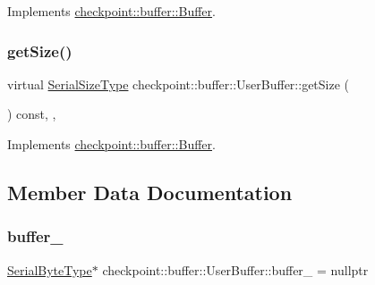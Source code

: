 Implements \hyperlink{structcheckpoint_1_1buffer_1_1_buffer_a11fcf5b280408aef29cd21dd722006c3}{checkpoint\+::buffer\+::\+Buffer}.

\mbox{\label{structcheckpoint_1_1buffer_1_1_user_buffer_a434e7feda041957509ee08791d3f4949}} 
\subsubsection{\texorpdfstring{get\+Size()}{getSize()}}
{\footnotesize\ttfamily virtual \hyperlink{namespacecheckpoint_a083f6674da3f94c2901b18c6d238217c}{Serial\+Size\+Type} checkpoint\+::buffer\+::\+User\+Buffer\+::get\+Size (\begin{DoxyParamCaption}{ }\end{DoxyParamCaption}) const\hspace{0.3cm}{\ttfamily [inline]}, {\ttfamily [override]}, {\ttfamily [virtual]}}



Implements \hyperlink{structcheckpoint_1_1buffer_1_1_buffer_a8f21655f43c4424cd88435ddebbb2d3c}{checkpoint\+::buffer\+::\+Buffer}.



\subsection{Member Data Documentation}
\mbox{\label{structcheckpoint_1_1buffer_1_1_user_buffer_a7fb5fb2686430c6a73572e835343c516}} 
\subsubsection{\texorpdfstring{buffer\+\_\+}{buffer\_}}
{\footnotesize\ttfamily \hyperlink{namespacecheckpoint_ae57f01cdc0b81776c23b6c7c934c58f5}{Serial\+Byte\+Type}$\ast$ checkpoint\+::buffer\+::\+User\+Buffer\+::buffer\+\_\+ = nullptr\hspace{0.3cm}{\ttfamily [private]}}

